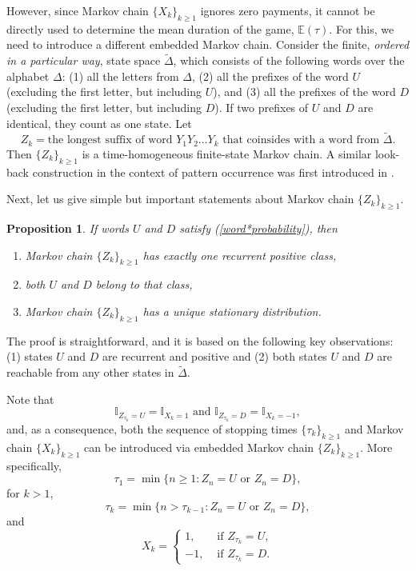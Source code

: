 \documentclass{amsart}
\newtheorem{Proposition}{Proposition}
\newcommand{\EE}{{\mathbb{E}}}
\newcommand{\I}{{\mathbb{I}}}
\newcommand{\1}{{\mathbf{1}}}
\begin{document}
However, since Markov chain $\{X_k\}_{k\geq 1}$ ignores zero payments, it cannot be
directly  used to determine the mean duration of the game, $\EE(\tau)$. For this, we need
to introduce a different embedded Markov chain. Consider the finite, {\it ordered in a particular way},
state space $\tilde{\Delta}$, which consists of the following words over the alphabet $\Delta$:
(1) all the letters from $\Delta$, (2) all the prefixes of the word $U$ (excluding the first letter,
but including $U$), and (3) all the prefixes of the word $D$ (excluding the first letter,
but including $D$). If two prefixes of $U$ and $D$ are identical, they count as one state.
Let
$$Z_k=\mbox{the longest suffix of word $Y_1Y_2\dots Y_k$ that coinsides with a word from $\tilde{\Delta}$}.$$
Then $\{Z_k\}_{k\geq 1}$ is a time-homogeneous finite-state Markov chain.
A similar look-back construction in the context of pattern occurrence was first introduced in \cite{GerberLi1981}.
{Next, let us give simple but important statements about Markov chain $\{Z_k\}_{k\geq 1}$.
\begin{Proposition}\label{Markov*Chain*Z}
If words $U$ and $D$ satisfy (\ref{word*probability}), then
\begin{enumerate}
\item Markov chain $\{Z_k\}_{k\geq 1}$ has exactly one recurrent positive class,
\item both $U$ and $D$  belong to that class,
\item Markov chain $\{Z_k\}_{k\geq 1}$ has a unique stationary distribution.
\end{enumerate}
\end{Proposition}
The proof is straightforward, and it is based on the following key observations:
(1) states $U$ and $D$ are recurrent and positive and
(2) both states $U$ and $D$ are reachable from  any other states in $\tilde{\Delta}$.}


Note that $$\I_{Z_{\tau_k}=U}=\I_{X_k=1}
\mbox{ and }\I_{Z_{\tau_k}=D}=\I_{X_k=-1},$$ and, as a consequence, both the sequence of stopping
times $\{\tau_k\}_{k\geq 1}$ and Markov chain $\{X_k\}_{k\geq 1}$ can be introduced via embedded
Markov chain $\{Z_k\}_{k\geq 1}$. More specifically,
\begin{equation*}\label{first*word*stopping*time*via*Y}
\tau_1=\min\{n\geq 1: Z_n=U \mbox{ or } Z_n =D\},
\end{equation*}
for $k>1$,
\begin{equation*}\label{k*word*stopping*time*via*Y}
\tau_k=\min\{n>\tau_{k-1}: Z_n=U \mbox{ or } Z_n =D\},
\end{equation*}
and
\begin{equation*}\label{X*via*Y}
X_k=\left\{\begin{array}{rl}
             1,& \mbox{ if }  Z_{\tau_k}=U, \\
             -1,& \mbox{ if } Z_{\tau_k}=D.
           \end{array}
\right.
\end{equation*}
\end{document}

